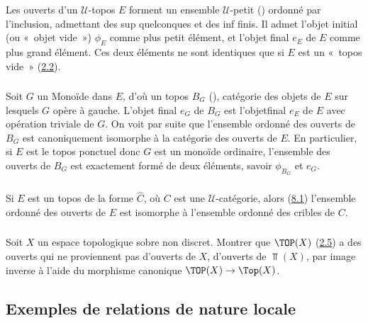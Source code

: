 \documentclass[10pt]{../fichiers-configuration-latex/smfart}
\begin{document}
\subsubsection{}
Les ouverts d'un $𝒰$-topos $E$ forment un ensemble
$𝒰$-petit () ordonné par l'inclusion,
admettant des sup quelconques et des inf finis. Il admet l'objet
initial (ou « objet vide ») $\phi_E$ comme plus petit élément,
et l'objet final $e_E$ de $E$ comme plus grand élément. Ces deux
éléments ne sont identiques que si $E$ est un « topos vide »
(\hyperref[IV.subsec2.2]{2.2}).

\subsubsection{}
Soit $G$ un Monoïde dans $E$, d'où un topos $B_G$
(), catégorie des objets de $E$ sur lesquels $G$
opère à gauche. L'objet final $e_G$ de $B_G$ est
l'objet\pageoriginale final $e_E$ de $E$ avec opération triviale de
$G$. On voit par suite que l'ensemble ordonné des ouverts de $B_G$
est canoniquement isomorphe à la catégorie des ouverts de $E$. En
particulier, si $E$ est le topos ponctuel donc $G$ est un monoïde
ordinaire, l'ensemble des ouverts de $B_G$ est exactement formé de
deux éléments, savoir $\phi_{B_G}$ et $e_G$.

\subsubsection{}
Si $E$ est un topos de la forme $\widehat{C}$, où $C$ est une
$𝒰$-catégorie, alors (\hyperref[IV.subsec8.1]{8.1}) l'ensemble ordonné
des ouverts de $E$ est isomorphe à l'ensemble ordonné des cribles de
$C$.

\subsubsection{}
Soit $X$ un espace topologique sobre non discret. Montrer que
$\TOP(X)$ (\hyperref[IV.subsec2.5]{2.5}) a des ouverts qui ne proviennent pas
d'ouverts de $X$, \ie d'ouverts de $\Top(X)$, par image inverse à
l'aide du morphisme canonique  $\TOP(X)\rightarrow
\Top(X)$.

\subsection{Exemples de relations de nature locale}
\end{document}
